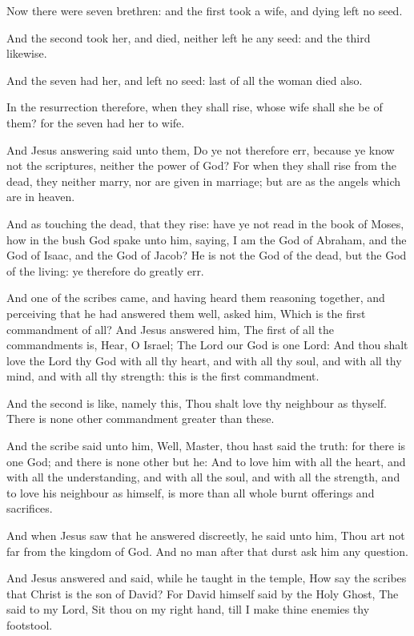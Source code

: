 \verse Now there were seven brethren: and the first took a wife, and dying left no seed.

\verse And the second took her, and died, neither left he any seed: and the third likewise.

\verse And the seven had her, and left no seed: last of all the woman died also.

\verse In the resurrection therefore, when they shall rise, whose wife shall she be of them? for the seven had her to wife.

\verse And Jesus answering said unto them, Do ye not therefore err, because ye know not the scriptures, neither the power of God?  \verse For when they shall rise from the dead, they neither marry, nor are given in marriage; but are as the angels which are in heaven.

\verse And as touching the dead, that they rise: have ye not read in the book of Moses, how in the bush God spake unto him, saying, I am the God of Abraham, and the God of Isaac, and the God of Jacob?  \verse He is not the God of the dead, but the God of the living: ye therefore do greatly err.

\verse And one of the scribes came, and having heard them reasoning together, and perceiving that he had answered them well, asked him, Which is the first commandment of all?  \verse And Jesus answered him, The first of all the commandments is, Hear, O Israel; The Lord our God is one Lord: \verse And thou shalt love the Lord thy God with all thy heart, and with all thy soul, and with all thy mind, and with all thy strength: this is the first commandment.

\verse And the second is like, namely this, Thou shalt love thy neighbour as thyself. There is none other commandment greater than these.

\verse And the scribe said unto him, Well, Master, thou hast said the truth: for there is one God; and there is none other but he: \verse And to love him with all the heart, and with all the understanding, and with all the soul, and with all the strength, and to love his neighbour as himself, is more than all whole burnt offerings and sacrifices.

\verse And when Jesus saw that he answered discreetly, he said unto him, Thou art not far from the kingdom of God. And no man after that durst ask him any question.

\verse And Jesus answered and said, while he taught in the temple, How say the scribes that Christ is the son of David?  \verse For David himself said by the Holy Ghost, The \LORD said to my Lord, Sit thou on my right hand, till I make thine enemies thy footstool.

